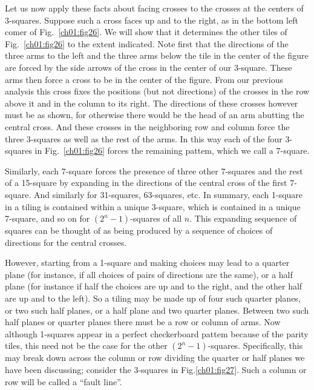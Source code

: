 \documentclass[reqno]{stml-l}
\theoremstyle{plain}
\theoremstyle{definition}
\numberwithin{equation}{chapter}
\begin{document}
Let us now apply these facts about facing crosses to the crosses at the centers of 3-squares. Suppose such a cross faces up and to the right, as in the bottom left comer of Fig.~\ref{ch01:fig26}. We will show that it determines the other tiles of Fig.~\ref{ch01:fig26} to the extent indicated. Note first that the directions of the three arms to the left and the three arms below the tile in the center of the figure are forced by the side arrows of the cross in the center of our 3-square. These arms then force a cross to be in the center of the figure. From our previous analysis this cross fixes the positions (but not directions) of the crosses in the row above it and in the column to its right. The directions of these crosses however must be as shown, for otherwise there would be the head of an arm abutting the central cross. And these crosses in the neighboring row and column force the three 3-squares as well as the rest of the arms. In this way each of the four 3-squares in Fig.~\ref{ch01:fig26} forces the remaining pattem, which we call a 7-square.

Similarly, each 7-square forces the presence of three other 7-squares and the rest of a 15-square by expanding in the directions of the central cross of the first 7-square. And similarly for 31-squares, 63-squares, etc. In summary, each 1-square in a tiling is contained within a unique 3-square, which is contained in a unique 7-square, and so on for $(2^{n}-1)$-squares of all $n$. This expanding sequence of squares can be thought of as being produced by a sequence of choices of directions for the central crosses.

However, starting from a 1-square and making choices may lead to a quarter plane (for instance, if all choices of pairs of directions are the same), or a half plane (for instance if half the choices are up and to the right, and the other half are up and to the left). So a tiling may be made up of four such quarter planes, or two such half planes, or a half plane and two quarter planes. Between two such half planes or quarter planes there must be a row or column of arms. Now although 1-squares appear in a perfect checkerboard pattem because of the parity tiles, this need not be the case for the other $(2^{n}-1)$-squares. Specifically, this may break down across the column or row dividing the quarter or half planes we have been discussing; consider the 3-squares in Fig.\ref{ch01:fig27}. Such a column or row will be called a ``fault line''.
\end{document}
